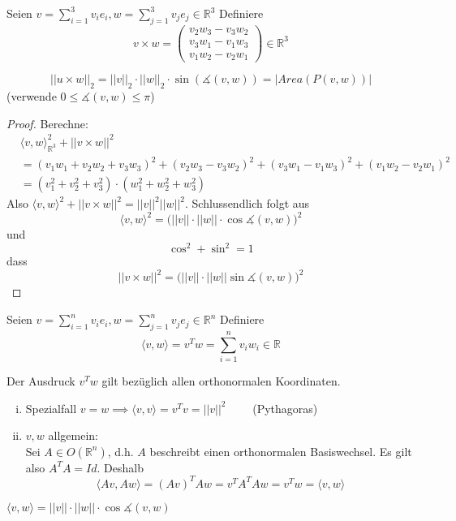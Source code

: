 \documentclass[../main.tex]{subfiles}
\begin{document}
\begin{einschub}
    Seien $v = \sum \limits_{i=1}^3 v_ie_i, w = \sum \limits_{j=1}^3 v_je_j \in \mathbb{R}^3$ 
    Definiere
    $$v\times w = \begin{pmatrix}
        v_2w_3 -v_3w_2 \\
        v_3w_1 -v_1w_3 \\
        v_1w_2 -v_2w_1
    \end{pmatrix} \in \mathbb{R}^3$$

    \begin{lemma}
        $$||u\times w ||_2 = ||v||_2 \cdot ||w||_2 \cdot \sin(\measuredangle (v,w)) = |Area(P(v,w))|$$(verwende $0 \le \measuredangle (v,w) \le \pi$)
    \end{lemma}
    \begin{proof}
        Berechne:
        \begin{align*}
            &\langle v,w \rangle _{\mathbb{R}^3}^2 + ||v\times w ||^2 \\
            &= (v_1w_1+v_2w_2+v_3w_3)^2+(v_2w_3-v_3w_2)^2+(v_3w_1-v_1w_3)^2+(v_1w_2-v_2w_1)^2 \\
            &= (v_1^2+v_2^2+v_3^2) \cdot (w_1^2+w_2^2+w_3^2)
        \end{align*}
        Also $\langle v,w\rangle ^2 + ||v\times w ||^2 = ||v||^2||w||^2$.
        Schlussendlich folgt aus $$\langle v,w\rangle^2=\big(||v||\cdot||w||\cdot \cos \measuredangle (v,w)\big)^2$$
        und $$\cos^2 + \sin^2 = 1$$dass $$||v\times w||^2 = \big(||v||\cdot||w||\sin \measuredangle(v,w) \big)^2$$ 
    \end{proof}
\end{einschub}
\begin{einschub}
    Seien $v = \sum \limits_{i=1}^n v_ie_i, w = \sum \limits_{j=1}^n v_je_j \in \mathbb{R}^n$ 
    Definiere
    $$\langle v,w\rangle = v^Tw = \sum \limits_{i=1}^n v_iw_i \in \mathbb{R}$$
    \begin{remark}
        Der Ausdruck $v^Tw$ gilt bezüglich allen orthonormalen Koordinaten.
    \end{remark}
    \begin{enumerate}[i)]
        \item Spezialfall $v=w \implies \langle v,v \rangle = v^Tv = ||v||^2 \qquad$ (Pythagoras)
        \item $v,w$ allgemein: \\
        Sei $A \in O(\mathbb{R}^n)$, d.h. $A$ beschreibt einen orthonormalen Basiswechsel. Es gilt also
        $A^TA = Id$. Deshalb
        $$\langle Av, Aw \rangle = (Av)^TAw = v^TA^TAw=v^Tw = \langle v,w\rangle $$
    \end{enumerate}
    \begin{lemma}
        $\langle v,w \rangle = ||v||\cdot ||w|| \cdot \cos \measuredangle (v,w)$
    \end{lemma}

\end{einschub}
\end{document}
